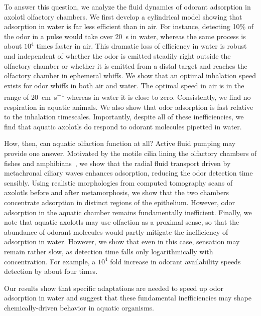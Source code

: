 \documentclass[%
 twocolumn,
 amsmath,amssymb,
 aps,prfluids,
 superscriptaddress,
]{revtex4-2}
\begin{document}
To answer this question, we analyze the fluid dynamics of odorant adsorption in axolotl olfactory chambers. 
We first develop a cylindrical model showing that adsorption in water is far less efficient than in air. For instance, detecting 10\% of the odor in a pulse would take over \SI{20}{\second} in  water, whereas the same process is about 
$10^4$ times faster in air. This dramatic loss of efficiency in water is robust and independent of whether the odor is emitted steadily right outside the olfactory chamber or whether it is emitted from a distal target and reaches the olfactory chamber in ephemeral whiffs. We show that an optimal inhalation speed exists for odor whiffs in both air and water. The optimal speed in air is in the range of \SI{20}{\centi\meter\per\second} whereas in water it is close to zero. Consistently, we find no respiration in aquatic animals. We also show that odor adsorption is fast relative to the inhalation timescales. Importantly, despite all of these inefficiencies, we find that aquatic axolotls do respond to odorant molecules pipetted in water. 

How, then, can aquatic olfaction function at all? Active fluid pumping may provide one answer. Motivated by the motile cilia lining the olfactory chambers of fishes and amphibians~\cite{reiten2017motile,ringers2019role}, we show that the radial fluid transport driven by metachronal ciliary waves enhances adsorption, reducing the odor detection time sensibly. Using realistic morphologies from computed tomography scans of axolotls before and after metamorphosis, we show that the two chambers concentrate adsorption in distinct regions of the epithelium.  
However, odor adsorption in the aquatic chamber remains fundamentally inefficient.
Finally, we note that aquatic axolotls may use olfaction as a proximal sense, so that the abundance of odorant molecules would partly mitigate the inefficiency of adsorption in water. However, we show that even in this case, sensation may remain rather slow, as detection time falls only logarithmically with concentration. For example, a $10^4$ fold increase in odorant availability speeds detection by about four times. 

Our results show that specific adaptations are needed to speed up odor adsorption in water and suggest that these fundamental inefficiencies may shape chemically-driven behavior in aquatic organisms. 
\end{document}
